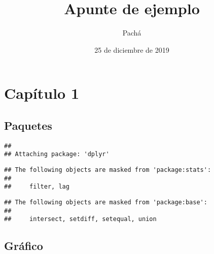 \documentclass[letterpaper,twoside, 10pt]{article}
\title{{Apunte de ejemplo}}
\author{{Pachá}}
\date{{25 de diciembre de 2019}}
\begin{document}
\maketitle
\tableofcontents

{\hypertarget{capuxedtulo-1}{%
\section{Capítulo 1}\label{capuxedtulo-1}}

\hypertarget{paquetes}{%
\subsection{Paquetes}\label{paquetes}}

\begin{Shaded}
\begin{Highlighting}[]
\end{Highlighting}
\end{Shaded}

\begin{verbatim}
## 
## Attaching package: 'dplyr'
\end{verbatim}

\begin{verbatim}
## The following objects are masked from 'package:stats':
## 
##     filter, lag
\end{verbatim}

\begin{verbatim}
## The following objects are masked from 'package:base':
## 
##     intersect, setdiff, setequal, union
\end{verbatim}

\hypertarget{gruxe1fico}{%
\subsection{Gráfico}\label{gruxe1fico}}

\begin{Shaded}
\end{Shaded}

}
\end{document}
